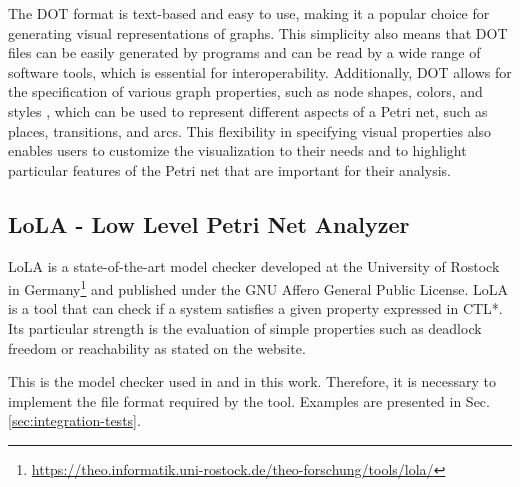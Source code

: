 The DOT format is text-based and easy to use,
making it a popular choice for generating visual representations of graphs.
This simplicity also means that DOT files can be easily generated by programs
and can be read by a wide range of software tools,
which is essential for interoperability.
Additionally, DOT allows for the specification of various graph properties,
such as node shapes, colors, and styles \cite{dot2015},
which can be used to represent different aspects of a Petri net,
such as places, transitions, and arcs.
This flexibility in specifying visual properties also enables users
to customize the visualization to their needs and
to highlight particular features of the Petri net
that are important for their analysis.

\subsection{LoLA - Low Level Petri Net Analyzer}

\acrfull{LoLA} is a state-of-the-art model checker
developed at the University of Rostock in
Germany\footnote{\url{https://theo.informatik.uni-rostock.de/theo-forschung/tools/lola/}}
and published under the GNU Affero General Public License.
\acrshort{LoLA} is a tool that can check
if a system satisfies a given property expressed in \acrfull{CTL*}.
Its particular strength is the evaluation of simple properties
such as deadlock freedom or reachability as stated on the website.

This is the model checker used in \cite{meyer2020} and in this work.
Therefore, it is necessary to implement the file format required by the tool.
Examples are presented in Sec. \ref{sec:integration-tests}.